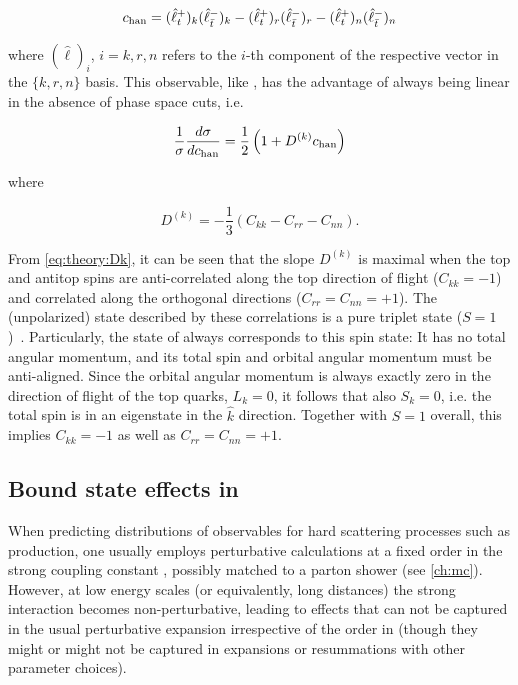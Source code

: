 \begin{equation}
    \label{eq:theory:chan}
    c_{\mathrm{han}} = (\hat{\ell}_t^+)_k (\hat{\ell}_{\bar{t}}^-)_k - (\hat{\ell}_t^+)_r (\hat{\ell}_{\bar{t}}^-)_r - (\hat{\ell}_t^+)_n (\hat{\ell}_{\bar{t}}^-)_n
\end{equation}

\noindent where $(\hat{\ell})_i$, $i=k,r,n$ refers to the $i$-th component of the respective vector in the $\{k,r,n\}$ basis. This observable, like \chel, has the advantage of always being linear in the absence of phase space cuts, i.e.

\begin{equation}
    \frac{1}{\sigma} \frac{d \sigma}{d c_{\mathrm{han}}} = \frac{1}{2}\left( 1 + D^{(k)} c_{\mathrm{han}} \right)
\end{equation}

\noindent where~\cite{Maltoni:2024tul}

\begin{equation}
\label{eq:theory:Dk}
    D^{(k)} = - \frac{1}{3} \left( C_{kk} - C_{rr} - C_{nn} \right) .
\end{equation}

From \cref{eq:theory:Dk}, it can be seen that the slope $D^{(k)}$ is maximal when the top and antitop spins are anti-correlated along the top direction of flight ($C_{kk} = -1$) and correlated along the orthogonal directions ($C_{rr} = C_{nn} = +1$). The (unpolarized) state described by these correlations is a pure triplet state ($S=1$)~\cite{Maltoni:2024tul}. Particularly, the  state of \ttbar always corresponds to this spin state: It has no total angular momentum, and its total spin and orbital angular momentum must be anti-aligned. Since the orbital angular momentum is always exactly zero in the direction of flight of the top quarks, $L_k = 0$, it follows that also $S_k = 0$, i.e. the total spin is in an eigenstate in the $\hat{k}$ direction. Together with $S=1$ overall, this implies $C_{kk} = -1$ as well as $C_{rr} = C_{nn} = +1$.



\subsection{Bound state effects in \ttbartitle}
\label{sec:theory:etat}

When predicting distributions of observables for hard scattering processes such as \ttbar production, one usually employs perturbative calculations at a fixed order in the strong coupling constant \alphas, possibly matched to a parton shower (see \cref{ch:mc}). However, at low energy scales (or equivalently, long distances) the strong interaction becomes non-perturbative, leading to effects that can not be captured in the usual perturbative expansion irrespective of the order in \alphas (though they might or might not be captured in expansions or resummations with other parameter choices).

